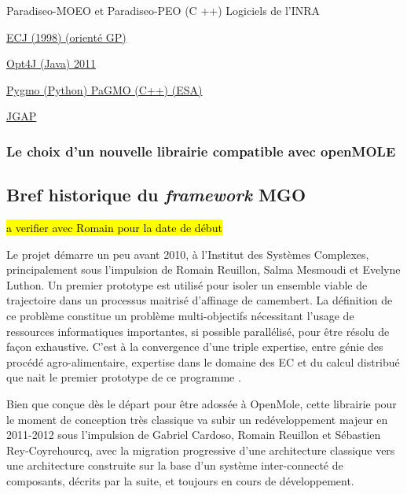 Paradiseo-MOEO et Paradiseo-PEO (C ++)
Logiciels de l'INRA

\href{http://cs.gmu.edu/~eclab/projects/ecj/}{ECJ (1998) (orienté GP)}

\href{http://opt4j.sourceforge.net/}{Opt4J (Java) 2011}

\href{http://esa.github.io/pygmo/}{Pygmo (Python) PaGMO (C++) (ESA)}

\href{http://jgap.sourceforge.net/}{JGAP}


\subsubsection{Le choix d'un nouvelle librairie compatible avec openMOLE}
\label{sssec:choix_lib_EA}



\subsection{Bref historique du \textit{framework} MGO}
\label{ssec:historique_mgo}

\hl{a verifier avec Romain pour la date de début}

Le projet démarre un peu avant 2010, à l'Institut des Systèmes Complexes, principalement sous l'impulsion de Romain Reuillon, Salma Mesmoudi et Evelyne Luthon. Un premier prototype est utilisé pour isoler un ensemble viable de trajectoire dans un processus maitrisé d'affinage de camembert. La définition de ce problème constitue un problème multi-objectifs nécessitant l'usage de ressources informatiques importantes, si possible parallélisé, pour être résolu de façon exhaustive. C'est à la convergence d'une triple expertise, entre génie des procédé agro-alimentaire, expertise dans le domaine des EC et du calcul distribué que nait le premier prototype de ce programme \autocite{Mesmoudi2010}.

Bien que conçue dès le départ pour être adossée à OpenMole, cette librairie pour le moment de conception très classique va subir un redéveloppement majeur en 2011-2012 sous l'impulsion de Gabriel Cardoso, Romain Reuillon et Sébastien Rey-Coyrehourcq, avec la migration progressive d'une architecture classique vers une architecture construite sur la base d'un système inter-connecté de composants, décrits par la suite, et toujours en cours de développement.

